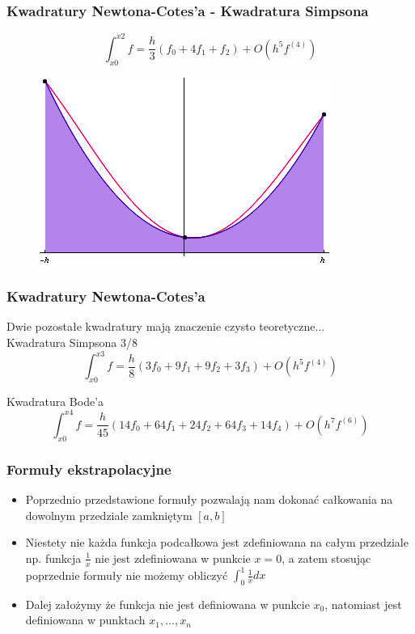 \documentclass[compress,red]{beamer}
\begin{document}
	\begin{frame}
		\frametitle{Kwadratury Newtona-Cotes'a - Kwadratura Simpsona}
		\[ \int_{x0}^{x2} f = \frac{h}{3}(f_0 + 4f_1 + f_2) + O(h^5 f^{(4)}) \]
		\begin{figure}
			\includegraphics[scale=0.5]{./img/q_sim}
		\end{figure} 
	\end{frame}	
	
	\begin{frame}
		\frametitle{Kwadratury Newtona-Cotes'a}
		Dwie pozostałe kwadratury mają znaczenie czysto teoretyczne...
		\\[1cm]
		
		Kwadratura Simpsona 3/8
		\[ \int_{x0}^{x3} f = \frac{h}{8}(3f_0 + 9f_1 + 9f_2 + 3f_3) + O(h^5 f^{(4)}) \]
		
		Kwadratura Bode'a
		\[ \int_{x0}^{x4} f = \frac{h}{45}(14f_0 + 64f_1 + 24f_2 + 64f_3 + 14f_4) + O(h^7 f^{(6)}) \]
	\end{frame}	
	
	\begin{frame}
		\frametitle{Formuły ekstrapolacyjne} 
		\begin{itemize}
			\item
				Poprzednio przedstawione formuły pozwalają nam dokonać
				całkowania na dowolnym przedziale zamkniętym $[a, b]$
			\item
				Niestety nie każda funkcja podcałkowa jest zdefiniowana na 
				całym przedziale np. funkcja $\frac{1}{x}$ nie jest zdefiniowana 
				w punkcie $x = 0$, a zatem stosując poprzednie formuły nie możemy 
				obliczyć $\int_0^1 \frac{1}{x} dx$
			\item
				Dalej założymy że funkcja nie jest definiowana w punkcie $ x_0 $,
				natomiast jest definiowana w punktach $ x_1, \ldots, x_n $
		\end{itemize}
	\end{frame}	
	
\end{document}
